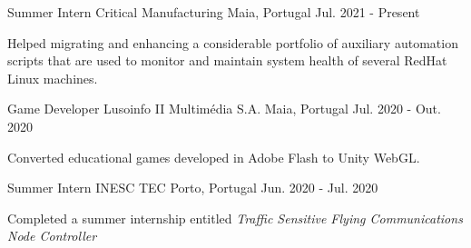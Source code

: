 
\begin{cventries}

\cventry
    {Summer Intern}   
    {Critical Manufacturing}   
    {Maia, Portugal}        
    {Jul. 2021 - Present} 
    {
      \begin{cvitems}
        \item {Helped migrating and enhancing a considerable portfolio of auxiliary automation scripts that are used to monitor and maintain system health of several RedHat Linux machines.}
      \end{cvitems}
    }

  \cventry
    {Game Developer}   
    {Lusoinfo II Multimédia S.A.}   
    {Maia, Portugal}        
    {Jul. 2020 - Out. 2020} 
    {
      \begin{cvitems}
        \item {Converted educational games developed in Adobe Flash to Unity WebGL.}
      \end{cvitems}
    }

  \cventry
    {Summer Intern} 
    {INESC TEC} 
    {Porto, Portugal} 
    {Jun. 2020 - Jul. 2020} 
    {
      \begin{cvitems}
        \item {Completed a summer internship entitled \textit{Traffic Sensitive Flying Communications Node Controller}
        }
      \end{cvitems}
    }



\end{cventries}
